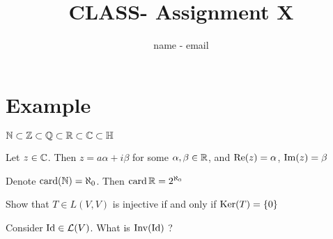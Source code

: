 \documentclass[12pt]{article}
\title{CLASS- Assignment X} %
\author{name - email}
\begin{document}
\maketitle

\section*{Example}

\begin{theorem}{1}
$\mathbb{N} \subset \mathbb{Z} \subset \mathbb{Q} \subset \mathbb{R} \subset \mathbb{C} \subset \mathbb{H}$
\end{theorem}

\begin{exercise}{2}
    Let $z \in \mathbb{C}$. Then $z = a\alpha + i\beta$ for some $\alpha, \beta \in \mathbb{R}$, 
    and $\operatorname{Re}(z) = \alpha$, $\operatorname{Im}(z) = \beta$
\end{exercise}

\begin{lemma}{3}
    Denote $\operatorname{card}(\mathbb{N})  = \aleph_0$. Then $\operatorname{card} \mathbb{R} = 2^{\aleph_0}$
\end{lemma}

\begin{problem}{4}
    Show that $T \in L(V,V)$ is injective if and only if $\operatorname{Ker}(T) = \left\{ 0 \right\}$
\end{problem}

\begin{question}{5}
    Consider $\operatorname{Id} \in \mathcal{L}(V)$. What is $\operatorname{Inv} (\operatorname{Id})$ ?
\end{question}
\end{document}
